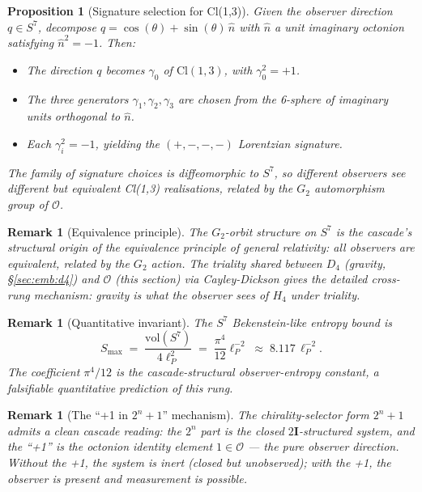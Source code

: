 \documentclass[12pt]{article}
\newtheorem{proposition}[theorem]{Proposition}
\newtheorem{remark}[theorem]{Remark}
\newcommand{\twoI}{2\mathbf{I}}
\begin{document}
\begin{proposition}[Signature selection for Cl(1,3)]\label{prop:signature}
Given the observer direction $q \in S^7$, decompose $q = \cos(\theta) + \sin(\theta)\, \hat{n}$ with $\hat{n}$ a unit imaginary octonion satisfying $\hat{n}^2 = -1$. Then:
\begin{itemize}
    \item The direction $q$ becomes $\gamma_0$ of $\mathrm{Cl}(1,3)$, with $\gamma_0^2 = +1$.
    \item The three generators $\gamma_1, \gamma_2, \gamma_3$ are chosen from the 6-sphere of imaginary units orthogonal to $\hat{n}$.
    \item Each $\gamma_i^2 = -1$, yielding the $(+, -, -, -)$ Lorentzian signature.
\end{itemize}
The family of signature choices is diffeomorphic to $S^7$, so different observers see different but equivalent Cl(1,3) realisations, related by the $G_2$ automorphism group of $\mathcal{O}$.
\end{proposition}

\begin{remark}[Equivalence principle]
The $G_2$-orbit structure on $S^7$ is the cascade's structural origin of the equivalence principle of general relativity: all observers are equivalent, related by the $G_2$ action. The triality shared between $D_4$ (gravity, §\ref{sec:emb:d4}) and $\mathcal{O}$ (this section) via Cayley-Dickson gives the detailed cross-rung mechanism: \emph{gravity is what the observer sees of $H_4$ under triality}.
\end{remark}

\begin{remark}[Quantitative invariant]
The $S^7$ Bekenstein-like entropy bound is
\[
S_{\max} \;=\; \frac{\mathrm{vol}(S^7)}{4 \ell_P^2} \;=\; \frac{\pi^4}{12} \ell_P^{-2} \;\approx\; 8.117 \, \ell_P^{-2}.
\]
The coefficient $\pi^4 / 12$ is the cascade-structural observer-entropy constant, a falsifiable quantitative prediction of this rung.
\end{remark}

\begin{remark}[The ``+1 in $2^n + 1$'' mechanism]
The chirality-selector form $2^n + 1$ admits a clean cascade reading: the $2^n$ part is the closed $\twoI$-structured system, and the ``+1'' is the octonion identity element $1 \in \mathcal{O}$ --- the pure observer direction. Without the +1, the system is inert (closed but unobserved); with the +1, the observer is present and measurement is possible.
\end{remark}
\end{document}
